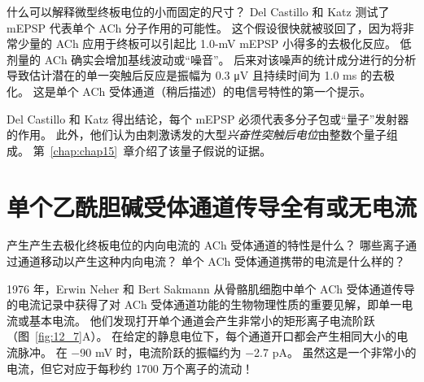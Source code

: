 什么可以解释微型终板电位的小而固定的尺寸？ 
Del Castillo 和 Katz 测试了 mEPSP 代表单个 ACh 分子作用的可能性。 
这个假设很快就被驳回了，因为将非常少量的 ACh 应用于终板可以引起比 1.0-mV mEPSP 小得多的去极化反应。 
低剂量的 ACh 确实会增加基线波动或“噪音”。 
后来对该噪声的统计成分进行的分析导致估计潜在的单一突触后反应是振幅为 0.3 μV 且持续时间为 1.0 ms 的去极化。 
这是单个 ACh 受体通道（稍后描述）的电信号特性的第一个提示。


Del Castillo 和 Katz 得出结论，每个 mEPSP 必须代表多分子包或“量子”发射器的作用。 
此外，他们认为由刺激诱发的大型\textit{兴奋性突触后电位}由整数个量子组成。 
第~\ref{chap:chap15}~章介绍了该量子假说的证据。



\section{单个乙酰胆碱受体通道传导全有或无电流}

产生产生去极化终板电位的内向电流的 ACh 受体通道的特性是什么？
哪些离子通过通道移动以产生这种内向电流？
单个 ACh 受体通道携带的电流是什么样的？


1976 年，Erwin Neher 和 Bert Sakmann 从骨骼肌细胞中单个 ACh 受体通道传导的电流记录中获得了对 ACh 受体通道功能的生物物理性质的重要见解，即单一电流或基本电流。
他们发现打开单个通道会产生非常小的矩形离子电流阶跃（图~\ref{fig:12_7}A）。
在给定的静息电位下，每个通道开口都会产生相同大小的电流脉冲。
在 −90 mV 时，电流阶跃的振幅约为 −2.7 pA。 
虽然这是一个非常小的电流，但它对应于每秒约 1700 万个离子的流动！


